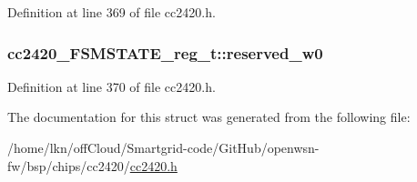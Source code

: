 Definition at line 369 of file cc2420.\+h.

\subsubsection[{\texorpdfstring{reserved\+\_\+w0}{reserved_w0}}]{ cc2420\+\_\+\+F\+S\+M\+S\+T\+A\+T\+E\+\_\+reg\+\_\+t\+::reserved\+\_\+w0}\hypertarget{structcc2420___f_s_m_s_t_a_t_e__reg__t_aaf6080d56d30826b92509da1346898c8}{}\label{structcc2420___f_s_m_s_t_a_t_e__reg__t_aaf6080d56d30826b92509da1346898c8}


Definition at line 370 of file cc2420.\+h.



The documentation for this struct was generated from the following file\+:\begin{DoxyCompactItemize}
\item 
/home/lkn/off\+Cloud/\+Smartgrid-\/code/\+Git\+Hub/openwsn-\/fw/bsp/chips/cc2420/\hyperlink{cc2420_8h}{cc2420.\+h}\end{DoxyCompactItemize}
